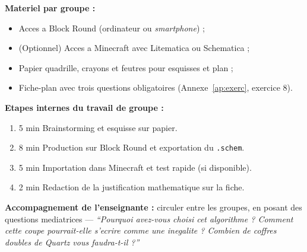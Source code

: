 \documentclass[12pt,a4paper]{scrartcl}
\newcommand{\tempo}[1]{\textnormal{\footnotesize\color{bg!90!white}\textsf{#1}}}
\begin{document}
\begin{activite}[5.3 --- Production \quad\tempo{20 min}]\label{at:53}
\textbf{Materiel par groupe :}
\begin{itemize}[leftmargin=1.3em,itemsep=0.15em,topsep=0.3em,nosep]
  \item Acces a Block Round (ordinateur ou \emph{smartphone}) ;
  \item (Optionnel) Acces a Minecraft avec Litematica ou Schematica ;
  \item Papier quadrille, crayons et feutres pour esquisses et plan ;
  \item Fiche-plan avec trois questions obligatoires (Annexe~\ref{ap:exerc}, exercice 8).
\end{itemize}

\textbf{Etapes internes du travail de groupe :}
\begin{enumerate}[leftmargin=1.5em,itemsep=0.15em,topsep=0.3em,nosep]
  \item \tempo{5 min} Brainstorming et esquisse sur papier.
  \item \tempo{8 min} Production sur Block Round et exportation du \texttt{.schem}.
  \item \tempo{5 min} Importation dans Minecraft et test rapide (si disponible).
  \item \tempo{2 min} Redaction de la justification mathematique sur la fiche.
\end{enumerate}

\textbf{Accompagnement de l'enseignant\textperiodcentered e :} circuler entre les groupes, en posant des questions mediatrices --- \emph{\enquote{Pourquoi avez-vous choisi cet algorithme ? Comment cette coupe pourrait-elle s'ecrire comme une inegalite ? Combien de coffres doubles de Quartz vous faudra-t-il ?}}
\end{activite}
\end{document}
